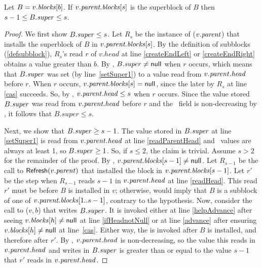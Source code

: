 \begin{lemma}\label{superRelation}
Let $B=v.\mbox{\textnormal{\textit{blocks}}}[b]$.
  If $v.\mbox{\textit{parent.blocks}}[s]$ is the superblock of $B$ then $s-1\leq B.\mbox{\textit{super}}\leq s$.
\end{lemma}
\begin{proof}
We first show $B.\mbox{\textit{super}}\leq s$.
Let $R_s$ be the instance of ($v.\mbox{\textit{parent}}$) that installs the superblock of $B$ 
in $v.\mbox{\textit{parent.blocks}}[s]$.
By the definition of subblocks (\ref{defsubblock}), $R_s$'s read $r$ of $v.head$ at line \ref{createEndLeft} or \ref{createEndRight} obtains a value greater than $b$.
By , $B.\mbox{\textit{super}} \neq \mbox{\sf null}$ when $r$ occurs, which means
that $B.\mbox{\textit{super}}$ was set (by line~\ref{setSuper1}) to a value read from $v.\mbox{\textit{parent}}.\mbox{\textit{head}}$ before $r$.
When $r$ occurs, $v.\mbox{\textit{parent.blocks}}[s] = \mbox{\sf null}$, since the later  by $R_s$ at line
\ref{cas} succeeds.
So, by , $v.\mbox{\textit{parent}}.\mbox{\textit{head}} \leq s$ when $r$ occurs.
Since the value stored $B.\mbox{\textit{super}}$ was read from $v.\mbox{\textit{parent.head}}$ before $r$ and the \head\ field is non-decreasing by , it follows that $B.super\leq s$.

Next, we show that $B.\mbox{\textit{super}}\geq s-1$.
The value stored in $B.\mbox{\textit{super}}$ at line \ref{setSuper1} is read from $v.\mbox{\textit{parent}}.\mbox{\textit{head}}$ at line \ref{readParentHead} and \head\ values are always at least 1, so $B.\mbox{\textit{super}} \geq 1$.
So, if $s\leq 2$, the claim is trivial.  Assume $s>2$ for the remainder of the proof.
By , $v.\mbox{\textit{parent.blocks}}[s-1]\neq \mbox{\sf null}$.  Let $R_{s-1}$ be the call to
${\sf Refresh}(v.\mbox{\textit{parent}})$ that installed the block in $v.\mbox{\textit{parent.blocks}}[s-1]$.
Let $r'$ be the step when $R_{s-1}$ reads $s-1$ in $v.\mbox{\textit{parent}}.\mbox{\textit{head}}$ at line \ref{readHead}.
This read $r'$ must be before $B$ is installed in $v$;
otherwise,  would imply that $B$ is a subblock of one of 
$v.\mbox{\textit{parent.blocks}}[1..s-1]$, contrary to the hypothesis.
Now, consider the call to ($v, b$) that writes $B.\mbox{\textit{super}}$.
It is invoked either 
at line \ref{helpAdvance} after seeing $v.\mbox{\textit{blocks}}[h]\neq \mbox{\sf null}$ at line \ref{ifHeadnotNull}
or at line \ref{advance} after ensuring $v.\mbox{\textit{blocks}}[h]\neq \mbox{\sf null}$ at line~\ref{cas}.
Either way, the  is invoked after $B$ is installed, and therefore after $r'$.
By , $v.\mbox{\textit{parent}}.\mbox{\textit{head}}$ is non-decreasing, so 
the value this  reads in $v.\mbox{\textit{parent}}.\mbox{\textit{head}}$ and
writes in $B.\mbox{\textit{super}}$ is greater than or equal to the value $s-1$ that $r'$ reads in $v.\mbox{\textit{parent}}.\mbox{\textit{head}}$.
\end{proof}

